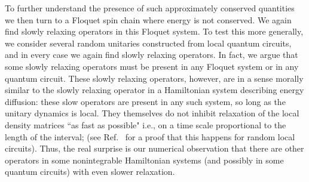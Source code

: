 \documentclass[twocolumn,superscriptaddress, prl,showpacs]{revtex4-1}
\begin{document}
To further understand the presence of such approximately conserved quantities we then turn to a Floquet spin chain where energy is not conserved.
We again find slowly relaxing operators in this Floquet system.
To test this more generally, 
we consider several random unitaries constructed from local quantum circuits, and in every case we again find slowly relaxing operators.
In fact, we argue that some slowly relaxing operators must be present in any Floquet system or in any quantum circuit.
These slowly relaxing operators, however, are in a sense morally similar to the slowly relaxing operator in a Hamiltonian system describing energy diffusion: these
slow operators are present in any such system, so long as the unitary dynamics is local.  They themselves do not inhibit relaxation of the local density matrices ``as fast as possible" i.e., on a time scale proportional to the length of the interval;
(see Ref.~ for a proof that this happens for random local circuits).
Thus, the real surprise is our numerical observation that there are other operators in some nonintegrable Hamiltonian systems (and possibly in some quantum circuits) with even slower relaxation.
\end{document}
